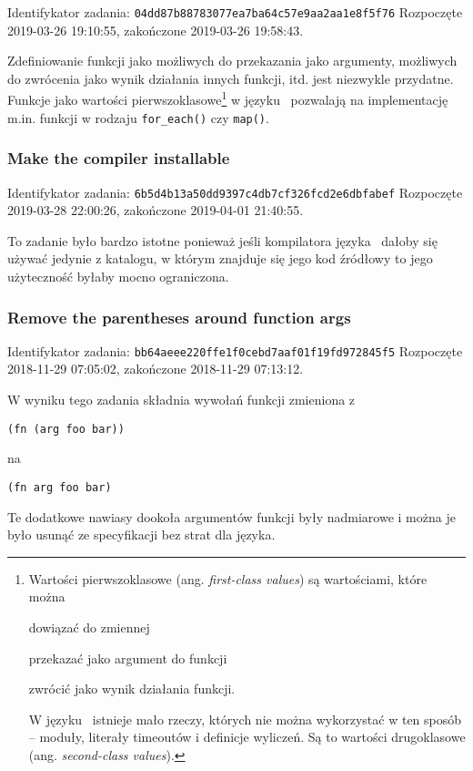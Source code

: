 Identifykator zadania: \texttt{04dd87b88783077ea7ba64c57e9aa2aa1e8f5f76}
\newline
Rozpoczęte 2019-03-26 19:10:55, zakończone 2019-03-26 19:58:43.
\newline

Zdefiniowanie funkcji jako możliwych do przekazania jako argumenty, możliwych do
zwrócenia jako wynik działania innych funkcji, itd. jest niezwykle przydatne.
Funkcje jako wartości pierwszoklasowe\footnote{Wartości pierwszoklasowe
(ang. \emph{first-class values}) są wartościami, które można
\begin{enumerate*}[label=(\arabic*)]
    \item dowiązać do zmiennej
    \item przekazać jako argument do funkcji
    \item zwrócić jako wynik działania funkcji.
\end{enumerate*}
W języku \ViuAct\ istnieje mało rzeczy, których nie
można wykorzystać w ten sposób -- moduły, literały timeoutów i definicje
wyliczeń. Są to wartości drugoklasowe (ang. \emph{second-class values}).} w
języku \ViuAct\ pozwalają na implementację m.in. funkcji w rodzaju
\texttt{for\_each()} czy \texttt{map()}.

\subsubsection{Make the compiler installable}

Identifykator zadania: \texttt{6b5d4b13a50dd9397c4db7cf326fcd2e6dbfabef}
\newline
Rozpoczęte 2019-03-28 22:00:26, zakończone 2019-04-01 21:40:55.
\newline

To zadanie było bardzo istotne ponieważ jeśli kompilatora języka \ViuAct\ dałoby
się używać jedynie z katalogu, w którym znajduje się jego kod źródłowy to jego
użyteczność byłaby mocno ograniczona.

\subsubsection{Remove the parentheses around function args}

Identifykator zadania: \texttt{bb64aeee220ffe1f0cebd7aaf01f19fd972845f5}
\newline
Rozpoczęte 2018-11-29 07:05:02, zakończone 2018-11-29 07:13:12.
\newline

W wyniku tego zadania składnia wywołań funkcji zmieniona z
\begin{lstlisting}
(fn (arg foo bar))
\end{lstlisting}
na
\begin{lstlisting}
(fn arg foo bar)
\end{lstlisting}
Te dodatkowe nawiasy dookoła argumentów funkcji były nadmiarowe i można je było
usunąć ze specyfikacji bez strat dla języka.

